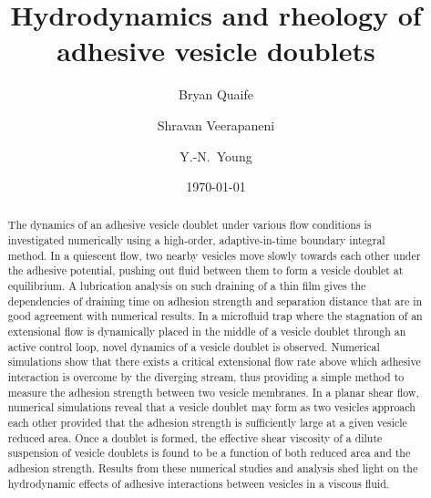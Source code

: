 \documentclass[prf,superscriptaddress,showpacs]{revtex4-1}
\begin{document}

\title{Hydrodynamics and rheology of adhesive vesicle doublets}

\author{Bryan Quaife}
\author{Shravan Veerapaneni}%
%
\author{Y.-N.~Young}%
%

\date{\today}%

\begin{abstract}
The dynamics of an adhesive vesicle doublet under various flow conditions is
investigated numerically using a high-order, adaptive-in-time boundary
integral method. In a quiescent flow, two nearby vesicles
move slowly towards each other under the adhesive potential, pushing out
fluid between them to form a vesicle doublet at equilibrium. A lubrication
analysis on such draining of a thin film gives the dependencies of
draining time on adhesion strength and separation distance that are in
good agreement with numerical results.
%
In a microfluid trap where the stagnation of an extensional flow is dynamically
placed in the middle of a vesicle doublet through an active control
loop, novel dynamics of a vesicle doublet is observed. Numerical
simulations show that there exists a critical extensional flow rate
above which adhesive interaction is overcome by the 
diverging stream, thus providing a simple method to measure the adhesion
strength between two vesicle membranes. 
%
In a planar shear flow, numerical simulations reveal that a vesicle
doublet may form as two vesicles approach each other provided that the adhesion
strength is sufficiently large at a given vesicle reduced area. Once a
doublet is formed, the effective shear viscosity of a dilute suspension
of vesicle doublets is found to be a function of both reduced area and
the adhesion strength.  Results from these numerical studies and
analysis shed light on the hydrodynamic effects of adhesive interactions
between vesicles in a viscous fluid.
\end{abstract}
\end{document}
